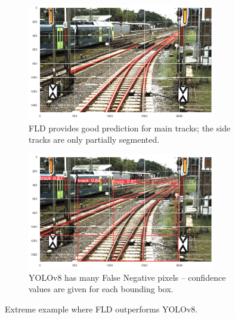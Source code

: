 \documentclass[Master,MDS,english]{BASE/twbook} %
\begin{document}
\begin{figure}
\centering
\begin{subfigure}{.5\textwidth}
  \centering
  \includegraphics[width=0.9\textwidth]{images/results/example2}
  \caption{FLD provides good prediction for main tracks; the side tracks are only partially segmented.}
\end{subfigure}%
\begin{subfigure}{.5\textwidth}
  \centering
  \includegraphics[width=0.9\textwidth]{images/results/example3}
  \caption{YOLOv8 has many False Negative pixels -- confidence values are given for each bounding box. }
\end{subfigure}
\caption{Extreme example where FLD outperforms YOLOv8.}
\label{fig:res_example2}
\end{figure}
\end{document}
